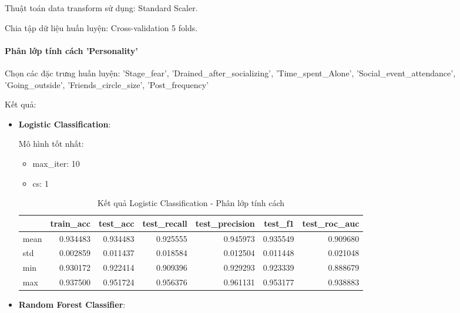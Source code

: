     Thuật toán data transform sử dụng: Standard Scaler.

    Chia tập dữ liệu huấn luyện: Cross-validation 5 folds.

    \paragraph{Phân lớp tính cách 'Personality'}
    \leavevmode

    Chọn các đặc trưng huấn luyện: 'Stage\_fear', 'Drained\_after\_socializing', 'Time\_spent\_Alone', 'Social\_event\_attendance', 'Going\_outside', 'Friends\_circle\_size', 'Post\_frequency'

    Kết quả:
    \begin{itemize}
        \item \textbf{Logistic Classification}: 
        
            Mô hình tốt nhất:
            \begin{itemize}
                \item max\_iter: 10
                \item cs: 1
            \end{itemize}

            \begin{table}[htbp]
            \centering
            \caption{Kết quả Logistic Classification - Phân lớp tính cách}
            \label{tab:Behavior-personality-LogCV}
            \begin{tabular}{lrrrrrr}
                \hline
                & train\_acc & test\_acc & test\_recall & test\_precision & test\_f1 & test\_roc\_auc \\
                \hline
                mean & 0.934483 & 0.934483 & 0.925555 & 0.945973 & 0.935549 & 0.909680 \\
                std & 0.002859 & 0.011437 & 0.018584 & 0.012504 & 0.011448 & 0.021048 \\
                min & 0.930172 & 0.922414 & 0.909396 & 0.929293 & 0.923339 & 0.888679 \\
                max & 0.937500 & 0.951724 & 0.956376 & 0.961131 & 0.953177 & 0.938883 \\
                \hline
            \end{tabular}
            \end{table}
  
            
            \FloatBarrier
            
        \item \textbf{Random Forest Classifier}:


\end{itemize}
